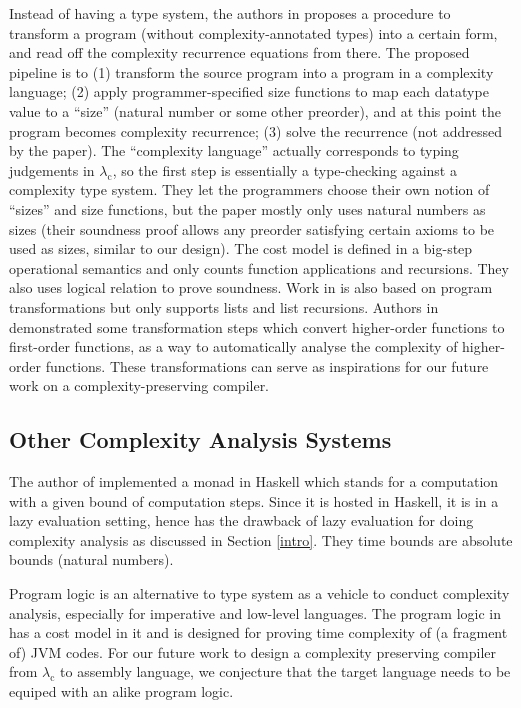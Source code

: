 \documentclass[preprint]{sigplanconf}
\newcommand{\logo}{\lambda_\mathrm{c}}
\begin{document}
Instead of having a type system, the authors in \cite{danner2015} proposes a procedure to transform a program (without complexity-annotated types) into a certain form, and read off the complexity recurrence equations from there. The proposed pipeline is to (1) transform the source program into a program in a complexity language; (2) apply programmer-specified size functions to map each datatype value to a ``size'' (natural number or some other preorder), and at this point the program becomes complexity recurrence; (3) solve the recurrence (not addressed by the paper). The ``complexity language'' actually corresponds to typing judgements in $\logo$, so the first step is essentially a type-checking against a complexity type system. They let the programmers choose their own notion of ``sizes'' and size functions, but the paper mostly only uses natural numbers as sizes (their soundness proof allows any preorder satisfying certain axioms to be used as sizes, similar to our design). The cost model is defined in a big-step operational semantics and only counts function applications and recursions. They also uses logical relation to prove soundness. Work in \cite{danner2013} is also based on program transformations but only supports lists and list recursions. Authors in \cite{avanzini2015} demonstrated some transformation steps which convert higher-order functions to first-order functions, as a way to automatically analyse the complexity of higher-order functions. These transformations can serve as inspirations for our future work on a complexity-preserving compiler.

\subsection{Other Complexity Analysis Systems}

The author of \cite{danielsson} implemented a monad in Haskell which stands for a computation with a given bound of computation steps. Since it is hosted in Haskell, it is in a lazy evaluation setting, hence has the drawback of lazy evaluation for doing complexity analysis as discussed in Section \ref{intro}. They time bounds are absolute bounds (natural numbers).

Program logic is an alternative to type system as a vehicle to conduct complexity analysis, especially for imperative and low-level languages. The program logic in \cite{aspinall} has a cost model in it and is designed for proving time complexity of (a fragment of) JVM codes. For our future work to design a complexity preserving compiler from $\logo$ to assembly language, we conjecture that the target language needs to be equiped with an alike program logic.
\end{document}
